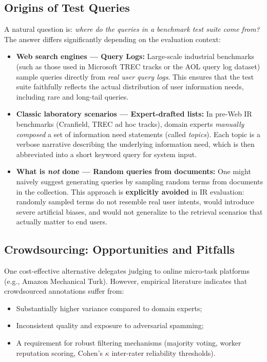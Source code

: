 \subsection{Origins of Test Queries}
\label{subsec:query-origins}

A natural question is: \emph{where do the queries in a benchmark test suite come from?} The answer differs significantly depending on the evaluation context:

\begin{itemize}
    \item \textbf{Web search engines — Query Logs:} Large-scale industrial benchmarks (such as those used in Microsoft TREC tracks or the AOL query log dataset) sample queries directly from \emph{real user query logs}. This ensures that the test suite faithfully reflects the actual distribution of user information needs, including rare and long-tail queries.
    \item \textbf{Classic laboratory scenarios — Expert-drafted lists:} In pre-Web IR benchmarks (Cranfield, TREC ad hoc tracks), domain experts \emph{manually composed} a set of information need statements (called \emph{topics}). Each topic is a verbose narrative describing the underlying information need, which is then abbreviated into a short keyword query for system input.
    \item \textbf{What is \emph{not} done — Random queries from documents:} One might naively suggest generating queries by sampling random terms from documents in the collection. This approach is \textbf{explicitly avoided} in IR evaluation: randomly sampled terms do not resemble real user intents, would introduce severe artificial biases, and would not generalize to the retrieval scenarios that actually matter to end users.
\end{itemize}

\subsection{Crowdsourcing: Opportunities and Pitfalls}
One cost-effective alternative delegates judging to online micro-task platforms (e.g., Amazon Mechanical Turk). However, empirical literature indicates that crowdsourced annotations suffer from:
\begin{itemize}
    \item Substantially higher variance compared to domain experts;
    \item Inconsistent quality and exposure to adversarial spamming;
    \item A requirement for robust filtering mechanisms (majority voting, worker reputation scoring, Cohen's $\kappa$ inter-rater reliability thresholds).
\end{itemize}

